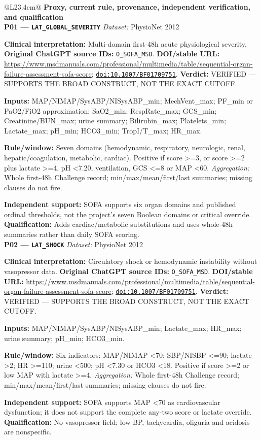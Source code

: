 \begin{tabular}{@{}L{23.4cm}@{}}
\toprule
\textbf{Proxy, current rule, provenance, independent verification, and qualification}\\
\midrule
\textbf{P01 --- \nolinkurl{LAT_GLOBAL_SEVERITY}} \hfill \textit{Dataset:} PhysioNet 2012\par\textbf{Clinical interpretation:} Multi-domain first-48h acute physiological severity. \textbf{Original ChatGPT source IDs:} \nolinkurl{O_SOFA_MSD}. \textbf{DOI/stable URL:} \url{https://www.msdmanuals.com/professional/multimedia/table/sequential-organ-failure-assessment-sofa-score}; \allowbreak \href{https://doi.org/10.1007/BF01709751}{\nolinkurl{doi:10.1007/BF01709751}}. \textbf{Verdict:} VERIFIED --- SUPPORTS THE BROAD CONSTRUCT, NOT THE EXACT CUTOFF.\par\textbf{Inputs:} MAP/NIMAP/SysABP/NISysABP\_min; MechVent\_max; PF\_min or PaO2/FiO2 approximation; SaO2\_min; RespRate\_max; GCS\_min; Creatinine/BUN\_max; urine summary; Bilirubin\_max; Platelets\_min; Lactate\_max; pH\_min; HCO3\_min; TropI/T\_max; HR\_max.\par\textbf{Rule/window:} Seven domains (hemodynamic, respiratory, neurologic, renal, hepatic/coagulation, metabolic, cardiac). Positive if score >=3, or score >=2 plus lactate >=4, pH <7.20, ventilation, GCS <=8 or MAP <60. \textit{Aggregation:} Whole first-48h Challenge record; min/max/mean/first/last summaries; missing clauses do not fire.\par\textbf{Independent support:} SOFA supports six organ domains and published ordinal thresholds, not the project's seven Boolean domains or critical override. \textbf{Qualification:} Adds cardiac/metabolic substitutions and uses whole-48h summaries rather than daily SOFA scoring. \\
\addlinespace[3pt]
\midrule
\textbf{P02 --- \nolinkurl{LAT_SHOCK}} \hfill \textit{Dataset:} PhysioNet 2012\par\textbf{Clinical interpretation:} Circulatory shock or hemodynamic instability without vasopressor data. \textbf{Original ChatGPT source IDs:} \nolinkurl{O_SOFA_MSD}. \textbf{DOI/stable URL:} \url{https://www.msdmanuals.com/professional/multimedia/table/sequential-organ-failure-assessment-sofa-score}; \allowbreak \href{https://doi.org/10.1007/BF01709751}{\nolinkurl{doi:10.1007/BF01709751}}. \textbf{Verdict:} VERIFIED --- SUPPORTS THE BROAD CONSTRUCT, NOT THE EXACT CUTOFF.\par\textbf{Inputs:} MAP/NIMAP/SysABP/NISysABP\_min; Lactate\_max; HR\_max; urine summary; pH\_min; HCO3\_min.\par\textbf{Rule/window:} Six indicators: MAP/NIMAP <70; SBP/NISBP <=90; lactate >2; HR >=110; urine <500; pH <7.30 or HCO3 <18. Positive if score >=2 or low MAP with lactate >=4. \textit{Aggregation:} Whole first-48h Challenge record; min/max/mean/first/last summaries; missing clauses do not fire.\par\textbf{Independent support:} SOFA supports MAP <70 as cardiovascular dysfunction; it does not support the complete any-two score or lactate override. \textbf{Qualification:} No vasopressor field; low BP, tachycardia, oliguria and acidosis are nonspecific. \\

\end{tabular}

